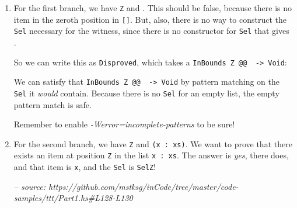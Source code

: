 \documentclass[]{article}
\newenvironment{Shaded}{}{}
\newcommand{\CommentTok}[1]{\textcolor[rgb]{0.38,0.63,0.69}{\textit{#1}}}
\newcommand{\DataTypeTok}[1]{\textcolor[rgb]{0.56,0.13,0.00}{#1}}
\newcommand{\FunctionTok}[1]{\textcolor[rgb]{0.02,0.16,0.49}{#1}}
\newcommand{\KeywordTok}[1]{\textcolor[rgb]{0.00,0.44,0.13}{\textbf{#1}}}
\newcommand{\NormalTok}[1]{#1}
\newcommand{\OtherTok}[1]{\textcolor[rgb]{0.00,0.44,0.13}{#1}}
\begin{document}
\begin{enumerate}
\def\labelenumi{\arabic{enumi}.}
\item
  For the first branch, we have \texttt{\textquotesingle{}Z} and
  \texttt{\textquotesingle{}{[}{]}}. This should be false, because there is no
  item in the zeroth position in \texttt{{[}{]}}. But, also, there is no way to
  construct the \texttt{Sel} necessary for the witness, since there is no
  constructor for \texttt{Sel} that gives \texttt{\textquotesingle{}{[}{]}}.

  So we can write this as \texttt{Disproved}, which takes a
  \texttt{InBounds\ \textquotesingle{}Z\ @@\ \textquotesingle{}{[}{]}\ -\textgreater{}\ Void}:

\begin{Shaded}
\end{Shaded}

  We can satisfy that
  \texttt{InBounds\ \textquotesingle{}Z\ @@\ \textquotesingle{}{[}{]}\ -\textgreater{}\ Void}
  by pattern matching on the \texttt{Sel} it \emph{would} contain. Because there
  is no \texttt{Sel} for an empty list, the empty pattern match is safe.

  Remember to enable \emph{-Werror=incomplete-patterns} to be sure!
\item
  For the second branch, we have \texttt{\textquotesingle{}Z} and
  \texttt{(x\ \textquotesingle{}:\ xs)}. We want to prove that there exists an
  item at position \texttt{\textquotesingle{}Z} in the list
  \texttt{x\ \textquotesingle{}:\ xs}. The answer is \emph{yes}, there does, and
  that item is \texttt{x}, and the \texttt{Sel} is \texttt{SelZ}!

\begin{Shaded}
\begin{Highlighting}[]
\CommentTok{-- source: https://github.com/mstksg/inCode/tree/master/code-samples/ttt/Part1.hs#L128-L130}


\end{Highlighting}
\end{Shaded}
\end{enumerate}
\end{document}
